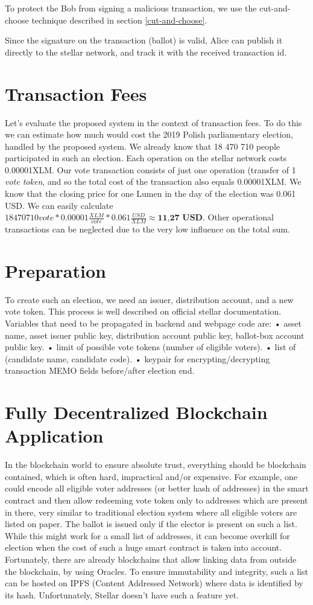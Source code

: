\documentclass[runningheads]{llncs}
\begin{document}
To protect the Bob from signing a malicious transaction, we use the cut-and-choose technique described in section \ref{cut-and-choose}.

Since the signature on the transaction (ballot) is valid, Alice can publish it directly to the stellar network, and track it with the received transaction id. 

\section{Transaction Fees}
Let’s evaluate the proposed system in the context of transaction fees. To do this we can estimate how much would cost the 2019 Polish parliamentary election, handled by the proposed system. We already know that 18 470 710 people participated in such an election. Each operation on the stellar network costs 0.00001XLM. Our vote transaction consists of just one operation (transfer of 1 \textit{vote token}, and so the total cost of the transaction also equals 0.00001XLM. We know that the closing price for one Lumen in the day of the election was 0.061 USD. We can easily calculate \(18470710 vote * 0.00001 \frac{XLM}{vote} * 0.061 \frac{USD}{XLM} \approx \textbf{11,27 USD}\). Other operational transactions can be neglected due to the very low influence on the total sum.

\section{Preparation}
To create such an election, we need an issuer, distribution account, and a new vote token. This process is well described on official stellar documentation. Variables that need to be propagated in backend and webpage code are:
• asset name, asset issuer public key, distribution account public key, ballot-box account public key.
• limit of possible vote tokens (number of eligible voters). 
• list of (candidate name, candidate code).
• keypair for encrypting/decrypting transaction MEMO fields before/after election end.

\section{Fully Decentralized Blockchain Application}
In the blockchain world to ensure absolute trust, everything should be blockchain contained, which is often hard, impractical and/or expensive. For example, one could encode all eligible voter addresses (or better hash of addresses) in the smart contract and then allow redeeming vote token only to addresses which are present in there, very similar to traditional election system where all eligible voters are listed on paper. The ballot is issued only if the elector is present on such a list. While this might work for a small list of addresses, it can become overkill for election when the cost of such a huge smart contract is taken into account. Fortunately, there are already blockchains that allow linking data from outside the blockchain, by using Oracles. To ensure immutability and integrity, such a list can be hosted on IPFS (Content Addressed Network) where data is identified by its hash. Unfortunately, Stellar doesn't have such a feature yet.
\end{document}

